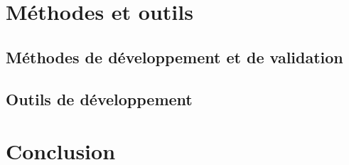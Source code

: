 \documentclass[11pt]{beamer}
\begin{document}
\section{Méthodes et outils}

\subsection{Méthodes de développement et de validation}


\subsection{Outils de développement}


\section{Conclusion}
\end{document}
